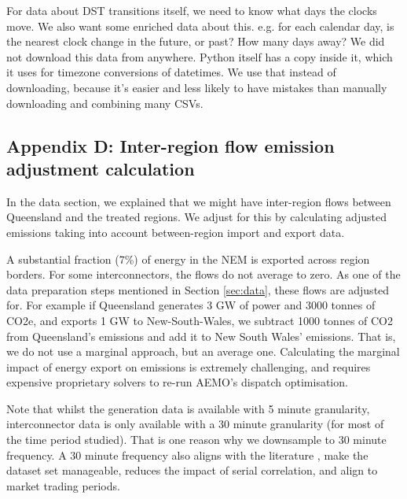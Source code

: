 For data about \ac{DST} transitions itself, we need to know what days the clocks move. We also want some enriched data about this. e.g. for each calendar day, is the nearest clock change in the future, or past? How many days away? We did not download this data from anywhere. Python itself has a copy inside it, which it uses for timezone conversions of datetimes. We use that instead of downloading, because it's easier and less likely to have mistakes than manually downloading and combining many CSVs.

\subsection*{Appendix D: Inter-region flow emission adjustment calculation}
\label{sec:interconnector calc}
In the data section, we explained that we might have inter-region flows between Queensland and the treated regions. We adjust for this by calculating adjusted emissions taking into account between-region import and export data. 

A substantial fraction (7\%) of energy in the \ac{NEM} is exported across region borders. For some interconnectors, the flows do not average to zero. As one of the data preparation steps mentioned in Section \ref{sec:data}, these flows are adjusted for. For example if Queensland generates 3 GW of power and 3000 tonnes of CO2e, and exports 1 GW to New-South-Wales, we subtract 1000 tonnes of CO2 from Queensland's emissions and add it to New South Wales' emissions. That is, we do not use a marginal approach, but an average one. Calculating the marginal impact of energy export on emissions is extremely challenging, and requires expensive proprietary solvers to re-run \ac{AEMO}'s dispatch optimisation.

Note that whilst the generation data is available with 5 minute granularity, interconnector data is only available with a 30 minute granularity (for most of the time period studied). That is one reason why we downsample to 30 minute frequency.
A 30 minute frequency also aligns with the literature \parencite{kellogg_daylight_2008}, make the dataset set manageable, reduces the impact of serial correlation, and align to market trading periods.